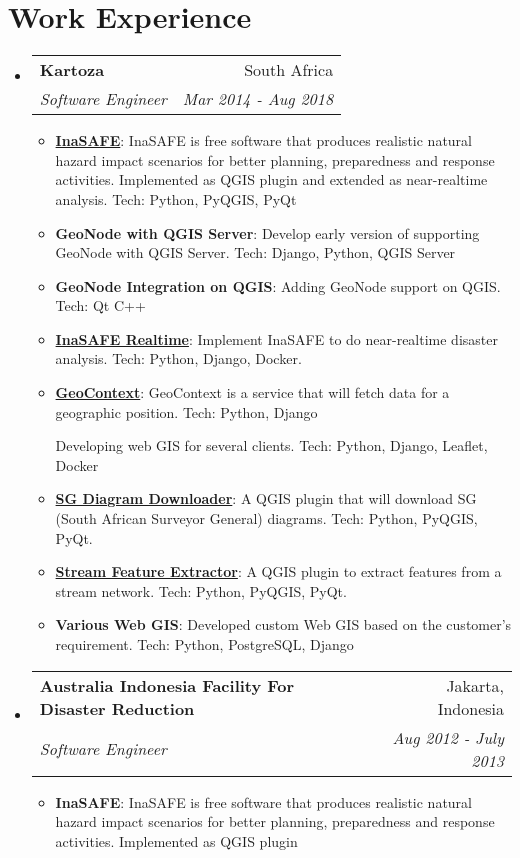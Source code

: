 \documentclass[letterpaper,11pt]{article}
\makeatletter
\newcommand{\resumeItem}[2]{
  \item\small{
    \textbf{#1}{: #2 \vspace{-2pt}}
  }
}
\newcommand{\resumeSubheading}[4]{
  \vspace{-1pt}\item
    \begin{tabular*}{0.97\textwidth}[t]{l@{\extracolsep{\fill}}r}
      \textbf{#1} & #2 \\
      \textit{\small#3} & \textit{\small #4} \\
    \end{tabular*}\vspace{-5pt}
}
\newcommand{\resumeSubHeadingListStart}{\begin{itemize}[leftmargin=*]}
\newcommand{\resumeSubHeadingListEnd}{\end{itemize}}
\newcommand{\resumeItemListStart}{\begin{itemize}}
\newcommand{\resumeItemListEnd}{\end{itemize}\vspace{-5pt}}
\makeatother
\begin{document}
\section{Work Experience}
  \resumeSubHeadingListStart
    \resumeSubheading
      {Kartoza}{South Africa}
      {Software Engineer}{Mar 2014 - Aug 2018}
      \resumeItemListStart
        \resumeItem{\href{http://inasafe.org/}{InaSAFE}}
          {InaSAFE is free software that produces realistic natural hazard impact scenarios for better planning, preparedness and response activities. Implemented as QGIS plugin and extended as near-realtime analysis. Tech: Python, PyQGIS, PyQt}
        \resumeItem{GeoNode with QGIS Server}
          {Develop early version of supporting GeoNode with QGIS Server. Tech: Django, Python, QGIS Server}
        \resumeItem{GeoNode Integration on QGIS}
          {Adding GeoNode support on QGIS. Tech: Qt C++}
        \resumeItem{\href{https://github.com/inasafe/inasafe-realtime}{InaSAFE Realtime}}
          {Implement InaSAFE to do near-realtime disaster analysis. Tech: Python, Django, Docker.}
        \resumeItem{\href{https://github.com/kartoza/geocontext}{GeoContext}}
          {GeoContext is a service that will fetch data for a geographic position. Tech: Python, Django}
          {Developing web GIS for several clients. Tech: Python, Django, Leaflet, Docker}
        \resumeItem{\href{http://plugins.qgis.org/plugins/SGDiagramDownloader/}{SG Diagram Downloader}}
          {A QGIS plugin that will download SG (South African Surveyor General) diagrams. Tech: Python, PyQGIS, PyQt.}
        \resumeItem{\href{http://plugins.qgis.org/plugins/StreamFeatureExtractor/}{Stream Feature Extractor}}
          {A QGIS plugin to extract features from a stream network. Tech: Python, PyQGIS, PyQt.}
        \resumeItem{Various Web GIS}
          {Developed custom Web GIS based on the customer's requirement. Tech: Python, PostgreSQL, Django}
      \resumeItemListEnd

    \resumeSubheading
      {Australia Indonesia Facility For Disaster Reduction}{Jakarta, Indonesia}
      {Software Engineer}{Aug 2012 - July 2013}
      \resumeItemListStart
        \resumeItem{InaSAFE}
          {InaSAFE is free software that produces realistic natural hazard impact scenarios for better planning, preparedness and response activities. Implemented as QGIS plugin}
      \resumeItemListEnd

  \resumeSubHeadingListEnd


\end{document}
